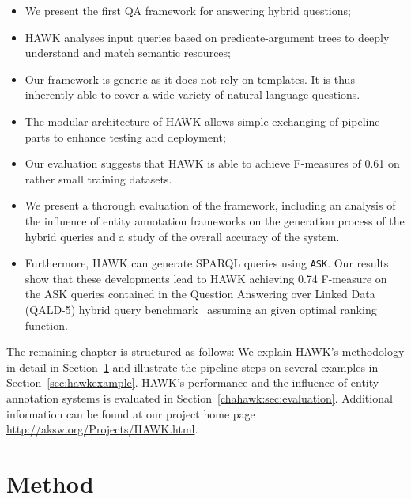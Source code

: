  \begin{itemize}
 \item We present the first \ac{QA} framework for answering hybrid questions;
 \item HAWK analyses input queries based on predicate-argument trees to deeply understand and match semantic resources;
 \item Our framework is generic as it does not rely on templates. It is thus inherently able to cover a wide variety of natural language questions. %
 \item The modular architecture of HAWK allows simple exchanging of pipeline parts to enhance testing and deployment;
 \item Our evaluation suggests that HAWK is able to achieve F-measures of 0.61 on rather small training datasets.
 \item We present a thorough evaluation of the framework, including an analysis of the influence of entity annotation frameworks on the generation process of the hybrid queries and a study of the overall accuracy of the system. 
 \item Furthermore, HAWK can generate SPARQL queries using \texttt{ASK}. Our results show that these developments lead to HAWK achieving 0.74 F-measure on the ASK queries contained in the Question Answering over Linked Data (\ac{QALD}-5) hybrid query benchmark~\cite{qald5} assuming an given optimal ranking function.
 \end{itemize}

The remaining chapter is structured as follows:
We explain HAWK's methodology in detail in Section~\ref{chahawk:sec:method} and illustrate the pipeline steps on several examples in Section~\ref{sec:hawkexample}.
HAWK's performance and the influence of entity annotation systems is evaluated in Section~\ref{chahawk:sec:evaluation}. 
Additional information can be found at our project home page \url{http://aksw.org/Projects/HAWK.html}.

\section{Method}
\label{chahawk:sec:method}

